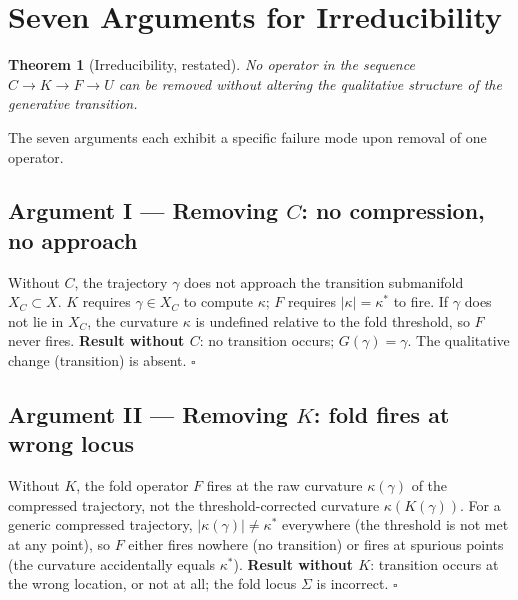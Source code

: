 \documentclass[14pt,a4paper]{extarticle}
\newtheorem{theorem}{Theorem}[section]
\begin{document}
\section{Seven Arguments for Irreducibility}
\label{sec:irreducibility-seven}

\begin{theorem}[Irreducibility, restated]
\label{thm:irred-full}
No operator in the sequence $C \to K \to F \to U$ can be removed
without altering the qualitative structure of the generative transition.
\end{theorem}

The seven arguments each exhibit a specific failure mode upon removal
of one operator.

\subsection*{Argument I\; — Removing $C$: no compression, no approach}

Without $C$, the trajectory $\gamma$ does not approach the
transition submanifold $X_C \subset X$.
$K$ requires $\gamma \in X_C$ to compute $\kappa$;
$F$ requires $|\kappa| = \kappa^*$ to fire.
If $\gamma$ does not lie in $X_C$, the curvature $\kappa$ is
undefined relative to the fold threshold, so $F$ never fires.
\textbf{Result without $C$}: no transition occurs; $G(\gamma) = \gamma$.
The qualitative change (transition) is absent.  \hfill $\square$

\subsection*{Argument II\; — Removing $K$: fold fires at wrong locus}

Without $K$, the fold operator $F$ fires at the raw curvature
$\kappa(\gamma)$ of the compressed trajectory, not the
threshold-corrected curvature $\kappa(K(\gamma))$.
For a generic compressed trajectory, $|\kappa(\gamma)| \ne \kappa^*$
everywhere (the threshold is not met at any point), so $F$ either
fires nowhere (no transition) or fires at spurious points
(the curvature accidentally equals $\kappa^*$).
\textbf{Result without $K$}: transition occurs at the wrong location,
or not at all; the fold locus $\Sigma$ is incorrect.  \hfill $\square$
\end{document}
